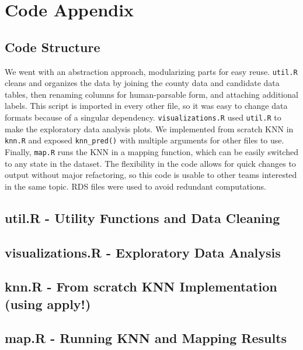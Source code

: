 \documentclass[11pt]{article}
\begin{document}
\newpage

\section{Code Appendix}
\subsection*{Code Structure}
We went with an abstraction approach, modularizing parts for easy reuse. \texttt{util.R} cleans and organizes the data by joining the county data and candidate data tables, then renaming columns for human-parsable form, and attaching additional labels. This script is imported in every other file, so it was easy to change data formats because of a singular dependency. \texttt{visualizations.R} used \texttt{util.R} to make the exploratory data analysis plots. We implemented from scratch KNN in \texttt{knn.R} and exposed \texttt{knn\_pred()} with multiple arguments for other files to use. Finally, \texttt{map.R} runs the KNN in a mapping function, which can be easily switched to any state in the dataset. The flexibility in the code allows for quick changes to output without major refactoring, so this code is usable to other teams interested in the same topic. RDS files were used to avoid redundant computations. 

\subsection{util.R - Utility Functions and Data Cleaning} 

\newpage
\subsection{visualizations.R - Exploratory Data Analysis} 

\newpage
\subsection{knn.R - From scratch KNN Implementation (using apply!)} 

\newpage
\subsection{map.R - Running KNN and Mapping Results} 

\end{document}
